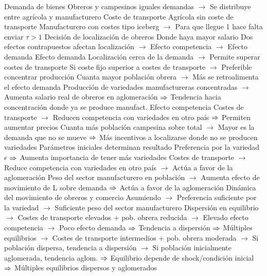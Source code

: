 \documentclass{nuevotema}
\begin{document}
\begin{esquemal}
				\4 Demanda de bienes
				\4[] Obreros y campesinos iguales demandas
				\4[] $\to$ Se distribuye entre agrícola y manufacturero
				\4 Coste de transporte
				\4[] Agrícola sin coste de transporte
				\4[] Manufacturero con costes tipo iceberg
				\4[] $\to$ Para que llegue 1 hace falta enviar $\tau > 1$
				\4 Decisión de localización de obreros
				\4[] Donde haya mayor salario
				\4[] Dos efectos contrapuestos afectan localización
				\4[] $\to$ Efecto competencia
				\4[] $\to$ Efecto demanda
				\4 Efecto demanda
				\4[] Localización cerca de la demanda
				\4[] $\to$ Permite superar costes de transporte
				\4[] Si coste fijo superior a costes de transporte
				\4[] $\to$ Preferible concentrar producción
				\4[] Cuanta mayor población obrera
				\4[] $\to$ Más se retroalimenta el efecto demanda
				\4[] Producción de variedades manufactureras concentradas
				\4[] $\to$ Aumenta salario real de obreros en aglomeración
				\4[] $\Rightarrow$ Tendencia hacia concentración donde ya se produce manufact.
				\4 Efecto competencia
				\4[] Costes de transporte
				\4[] $\to$ Reducen competencia con variedades en otro país
				\4[] $\Rightarrow$ Permiten aumentar precios
				\4[] Cuanta más población campesina sobre total
				\4[] $\to$ Mayor es la demanda que no se mueve
				\4[] $\Rightarrow$ Más incentivos a localizarse donde no se producen variedades
				\4 Parámetros iniciales determinan resultado
				\4[] Preferencia por la variedad $\epsilon$
				\4[] $\Rightarrow$ Aumenta importancia de tener más variedades
				\4[] Costes de transporte
				\4[] $\to$ Reduce competencia con variedades en otro país
				\4[] $\to$ Actúa a favor de la aglomeración
				\4[] Peso del sector manufacturero en población
				\4[] $\to$ Aumenta efecto de movimiento de L sobre demanda
				\4[] $\Rightarrow$ Actúa a favor de la aglomeración
				\4 Dinámica del movimiento de obreros y comercio
				\4[] Asumiendo
				\4[] $\to$ Preferencia suficiente por la variedad
				\4[] $\to$ Suficiente peso del sector manufacturero
				\4[] Dispersión en equilibrio
				\4[] $\to$ Costes de transporte elevados +  pob. obrera reducida
				\4[] $\to$ Elevado efecto competencia
				\4[] $\to$ Poco efecto demanda
				\4[] $\Rightarrow$ Tendencia a dispersión
				\4[] $\Rightarrow$ 
				\4[] Múltiples equilibrios
				\4[] $\to$ Costes de transporte intermedios + pob. obrera moderada
				\4[] $\to$ Si población dispersa, tendencia a dispersión
				\4[] $\to$ Si población inicialmente aglomerada, tendencia aglom.
				\4[] $\Rightarrow$ Equilibrio depende de shock/condición inicial
				\4[] $\Rightarrow$ Múltiples equilibrios dispersos y aglomerados

\end{esquemal}
\end{document}
